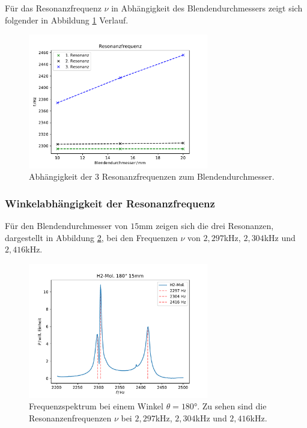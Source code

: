 Für das Resonanzfrequenz $\nu$ in Abhängigkeit des Blendendurchmessers zeigt sich folgender in Abbildung \ref{fig:blende_mol}
Verlauf.
\begin{figure}[H]
    \center
    \includegraphics[width=0.7\textwidth]{plots/Hatom/res_blende.pdf}
    \caption{Abhängigkeit der 3 Resonanzfrequenzen zum Blendendurchmesser.}
    \label{fig:blende_mol}
\end{figure}

\subsubsection*{Winkelabhängigkeit der Resonanzfrequenz}
Für den Blendendurchmesser von $15$mm zeigen sich die drei Resonanzen, dargestellt in Abbildung \ref{fig:blende_16_res},
bei den Frequenzen $\nu$ von $2,297$kHz, $2,304$kHz und $2,416$kHz.
\begin{figure}[H]
    \center
    \includegraphics[width=0.7\textwidth]{plots/Hatom/zustandsaufspaltung_mol15.pdf}
    \caption{Frequenzspektrum bei einem Winkel $\theta=180°$. Zu sehen sind die Resonanzenfrequenzen $\nu$ bei $2,297$kHz, $2,304$kHz und $2,416$kHz.}
    \label{fig:blende_16_res}
\end{figure}

